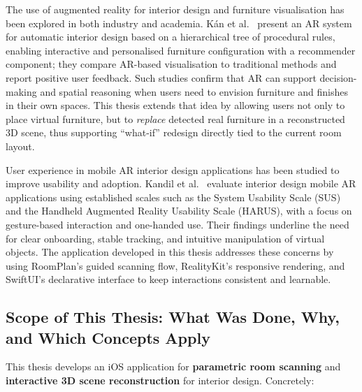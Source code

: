 The use of augmented reality for interior design and furniture visualisation has been explored in both industry and academia. K\'an et al.\ \cite{kan2021ar} present an AR system for automatic interior design based on a hierarchical tree of procedural rules, enabling interactive and personalised furniture configuration with a recommender component; they compare AR-based visualisation to traditional methods and report positive user feedback. Such studies confirm that AR can support decision-making and spatial reasoning when users need to envision furniture and finishes in their own spaces. This thesis extends that idea by allowing users not only to place virtual furniture, but to \emph{replace} detected real furniture in a reconstructed 3D scene, thus supporting ``what-if'' redesign directly tied to the current room layout.

User experience in mobile AR interior design applications has been studied to improve usability and adoption. Kandil et al.\ \cite{kandil2021ux} evaluate interior design mobile AR applications using established scales such as the System Usability Scale (SUS) and the Handheld Augmented Reality Usability Scale (HARUS), with a focus on gesture-based interaction and one-handed use. Their findings underline the need for clear onboarding, stable tracking, and intuitive manipulation of virtual objects. The application developed in this thesis addresses these concerns by using RoomPlan's guided scanning flow, RealityKit's responsive rendering, and SwiftUI's declarative interface to keep interactions consistent and learnable.

\subsection{Scope of This Thesis: What Was Done, Why, and Which Concepts Apply}
\label{sec:scope}

This thesis develops an iOS application for \textbf{parametric room scanning} and \textbf{interactive 3D scene reconstruction} for interior design. Concretely:


